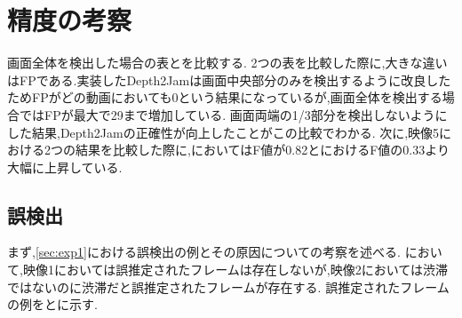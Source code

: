 
\section{精度の考察}
画面全体を検出した場合の表とを比較する.
2つの表を比較した際に,大きな違いはFPである.実装したDepth2Jamは画面中央部分のみを検出するように改良したためFPがどの動画においても0という結果になっているが,画面全体を検出する場合ではFPが最大で29まで増加している.
画面両端の1/3部分を検出しないようにした結果,Depth2Jamの正確性が向上したことがこの比較でわかる.
次に,映像5における2つの結果を比較した際に,においてはF値が0.82とにおけるF値の0.33より大幅に上昇している.

\subsection{誤検出}
まず,\ref{sec:exp1}における誤検出の例とその原因についての考察を述べる.
において,映像1においては誤推定されたフレームは存在しないが,映像2においては渋滞ではないのに渋滞だと誤推定されたフレームが存在する.
誤推定されたフレームの例をとに示す.

